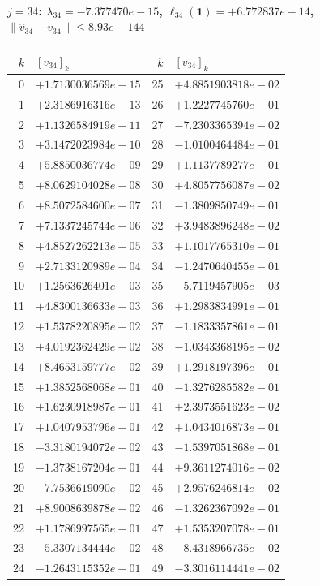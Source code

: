\documentclass[11pt]{article}
\begin{document}
\paragraph{$j = 34$: $\lambda_{34} = -7.377470e-15$, \quad $\ell_{34}(\mathbf{1}) = +6.772837e-14$, \quad $\|\hat v_{34} - v_{34}\| \leq 8.93e-144$}
\begin{center}
{\footnotesize
\begin{tabular}{r@{\;\;}l@{\quad}r@{\;\;}l}
\toprule
$k$ & $[v_{34}]_k$ & $k$ & $[v_{34}]_k$ \\
\midrule
0 & $+1.7130036569e-15$ & 25 & $+4.8851903818e-02$ \\
1 & $+2.3186916316e-13$ & 26 & $+1.2227745760e-01$ \\
2 & $+1.1326584919e-11$ & 27 & $-7.2303365394e-02$ \\
3 & $+3.1472023984e-10$ & 28 & $-1.0100464484e-01$ \\
4 & $+5.8850036774e-09$ & 29 & $+1.1137789277e-01$ \\
5 & $+8.0629104028e-08$ & 30 & $+4.8057756087e-02$ \\
6 & $+8.5072584600e-07$ & 31 & $-1.3809850749e-01$ \\
7 & $+7.1337245744e-06$ & 32 & $+3.9483896248e-02$ \\
8 & $+4.8527262213e-05$ & 33 & $+1.1017765310e-01$ \\
9 & $+2.7133120989e-04$ & 34 & $-1.2470640455e-01$ \\
10 & $+1.2563626401e-03$ & 35 & $-5.7119457905e-03$ \\
11 & $+4.8300136633e-03$ & 36 & $+1.2983834991e-01$ \\
12 & $+1.5378220895e-02$ & 37 & $-1.1833357861e-01$ \\
13 & $+4.0192362429e-02$ & 38 & $-1.0343368195e-02$ \\
14 & $+8.4653159777e-02$ & 39 & $+1.2918197396e-01$ \\
15 & $+1.3852568068e-01$ & 40 & $-1.3276285582e-01$ \\
16 & $+1.6230918987e-01$ & 41 & $+2.3973551623e-02$ \\
17 & $+1.0407953796e-01$ & 42 & $+1.0434016873e-01$ \\
18 & $-3.3180194072e-02$ & 43 & $-1.5397051868e-01$ \\
19 & $-1.3738167204e-01$ & 44 & $+9.3611274016e-02$ \\
20 & $-7.7536619090e-02$ & 45 & $+2.9576246814e-02$ \\
21 & $+8.9008639878e-02$ & 46 & $-1.3262367092e-01$ \\
22 & $+1.1786997565e-01$ & 47 & $+1.5353207078e-01$ \\
23 & $-5.3307134444e-02$ & 48 & $-8.4318966735e-02$ \\
24 & $-1.2643115352e-01$ & 49 & $-3.3016114441e-02$ \\
\bottomrule
\end{tabular}
}
\end{center}
\end{document}
